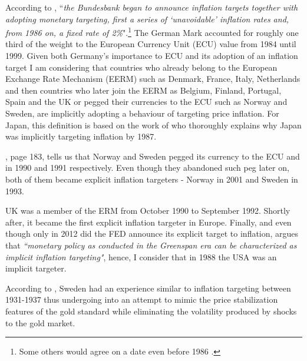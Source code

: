 \documentclass[12pt]{article}
\begin{document}
\begin{appendices}
According to \cite{vonHagen1999}, ``\textit{the Bundesbank began to announce inflation targets together with adopting monetary targeting, first a series of `unavoidable’ inflation rates and, from 1986 on, a fixed rate of 2\%}".\footnote{Some others would agree on a date even before 1986 \cite{Mishkin2001}.} The German Mark accounted for roughly one third of the weight to the European Currency Unit (ECU) value from 1984 until 1999. Given both Germany's importance to ECU and its adoption of an inflation target I am considering that countries who already belong to the European Exchange Rate Mechanism (EERM) such as Denmark, France, Italy, Netherlands and then countries who later join the EERM as Belgium, Finland, Portugal, Spain and the UK or pegged their currencies to the ECU such as Norway and Sweden, are implicitly adopting a behaviour of targeting price inflation. For Japan, this definition is based on the work of \cite{Jinushi2000} who thoroughly explains why Japan was implicitly targeting inflation by 1987.

\cite{Ungerer1997}, page 183, tells us that Norway and Sweden pegged its currency to the ECU and in 1990 and 1991 respectively. Even though they abandoned such peg later on, both of them became explicit inflation targeters - Norway in 2001 and Sweden in 1993. 

UK was a member of the ERM from October 1990 to September 1992. Shortly after, it became the first explicit inflation targeter in Europe. Finally, and even though only in 2012 did the FED announce its explicit target to inflation, \cite{Goodfriend2004} argues that \textit{``monetary policy as conducted in the Greenspan era can be characterized as implicit inflation targeting"}, hence, I consider that in 1988 the USA was an implicit targeter.

According to \cite{Berg1999}, Sweden had an experience similar to inflation targeting between 1931-1937 thus undergoing into an attempt to mimic the price stabilization features of the gold standard while eliminating the volatility produced by shocks to the gold market. 





\end{appendices}
\end{document}
